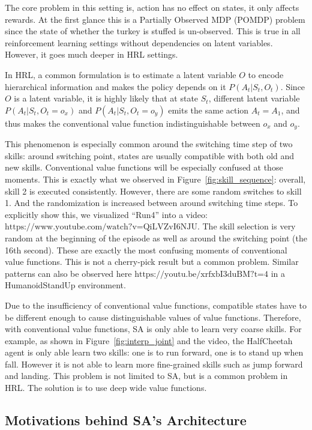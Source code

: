 The core problem in this setting is, action has no effect on
states, it only affects rewards. At the first glance this is a
Partially Observed MDP (POMDP) problem since the state of whether
the turkey is stuffed is un-observed. This is true in all
reinforcement learning settings without dependencies on latent
variables. However, it goes much deeper in HRL settings.

In HRL, a common formulation is to estimate a latent variable $O$
to encode hierarchical information and makes the policy depends
on it $P(A_t|S_t,O_t)$. Since $O$ is a latent variable, it is
highly likely that at state $S_t$, different latent variable
$P(A_t|S_t,O_t=o_x)$ and $P(A_t|S_t,O_t=o_y)$ emits the same
action $A_t=A_1$, and thus makes the conventional value function
indistinguishable between $o_x$ and $o_y$.

This phenomenon is especially common around the switching time
step of two skills: around switching point, states are usually
compatible with both old and new skills. Conventional value
functions will be especially confused at those moments. This is
exactly what we observed in Figure~\ref{fig:skill_sequence}:
overall, skill 2 is executed consistently. However, there are
some random switches to skill 1. And the randomization is
increased between around switching time steps. To explicitly show
this, we visualized ``Run4'' into a video:
$\text{https://www.youtube.com/watch?v=QiLVZvI6NJU}$. The skill
selection is very random at the beginning of the episode as well
as around the switching point (the 16th second). These are
exactly the most confusing moments of conventional value
functions. This is not a cherry-pick result but a common problem.
Similar patterns can also be observed here
$\text{https://youtu.be/xrfxbI3duBM?t=4}$ in a HumanoidStandUp
environment.

Due to the insufficiency of conventional value functions,
compatible states have to be different enough to cause
distinguishable values of value functions. Therefore, with
conventional value functions, SA is only able to learn very
coarse skills. For example, as shown in
Figure~\ref{fig:interp_joint} and the video, the HalfCheetah
agent is only able learn two skills: one is to run forward, one
is to stand up when fall. However it is not able to learn more
fine-grained skills such as jump forward and landing. This
problem is not limited to SA, but is a common problem in HRL. The
solution is to use deep wide value functions.

\subsection{Motivations behind SA's Architecture}
\label{sec:append_dwsa}

